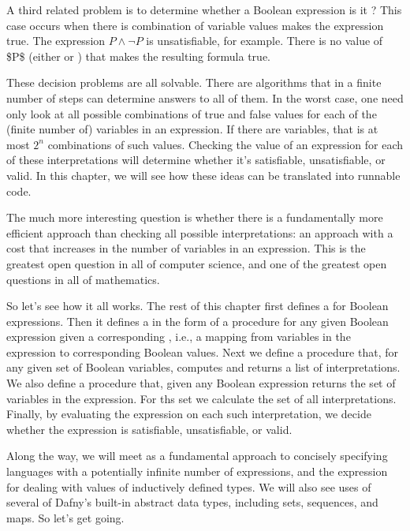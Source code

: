 \documentclass[letterpaper,10pt,english]{sphinxmanual}
\begin{document}
A third related problem is to determine whether a Boolean expression
is it ? This case occurs when there is  combination
of variable values makes the expression true. The expression \(P
\land \neg P\) is unsatisfiable, for example. There is no value of \$P\$
(either  or ) that makes the resulting formula true.

These decision problems are all solvable. There are algorithms that in
a finite number of steps can determine answers to all of them. In the
worst case, one need only look at all possible combinations of true
and false values for each of the (finite number of) variables in an
expression. If there are  variables, that is at most \(2^n\)
combinations of such values. Checking the value of an expression for
each of these interpretations will determine whether it’s satisfiable,
unsatisfiable, or valid. In this chapter, we will see how these ideas
can be translated into runnable code.

The much more interesting question is whether there is a fundamentally
more efficient approach than checking all possible interpretations: an
approach with a cost that increases  in the number of
variables in an expression. This is the greatest open question in all
of computer science, and one of the greatest open questions in all of
mathematics.

So let’s see how it all works. The rest of this chapter first defines
a  for Boolean expressions. Then it defines a  in
the form of a procedure for  any given Boolean expression
given a corresponding , i.e., a mapping from variables
in the expression to corresponding Boolean values. Next we define a
procedure that, for any given set of Boolean variables, computes and
returns a list of  interpretations. We also define a procedure
that, given any Boolean expression returns the set of variables in the
expression. For ths set we calculate the set of all interpretations.
Finally, by evaluating the expression on each such interpretation, we
decide whether the expression is satisfiable, unsatisfiable, or valid.

Along the way, we will meet  as a fundamental
approach to concisely specifying languages with a potentially infinite
number of expressions, and the  expression for dealing with
values of inductively defined types. We will also see uses of several
of Dafny’s built-in abstract data types, including sets, sequences,
and maps. So let’s get going.
\end{document}
